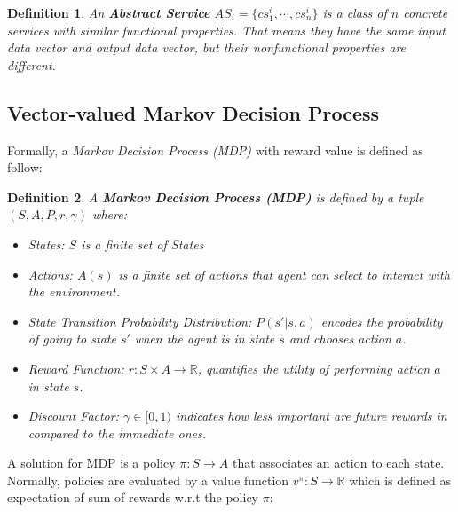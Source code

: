 \documentclass{sigchi}
\newtheorem{definition}{Definition}
\begin{document}
\begin{definition}
An \textbf{Abstract Service} $AS_i = \{ cs_1^i, \cdots, cs_n^i \}$ is a class of $n$ concrete services with similar functional properties. That means they have the same input data vector and output data vector, but their nonfunctional properties are different. 
\end{definition}


\subsection{Vector-valued Markov Decision Process}

Formally, a \emph{Markov Decision Process (MDP)} with reward value is defined as follow:

\begin{definition}
A \textbf{Markov Decision Process (MDP)} \cite{Puterman:1994:MDP:528623} is defined by a tuple $(S, A, P, r, \gamma)$ where:

\begin{itemize}
\item[-]States: $S$ is a finite set of States
\item[-] Actions: $A(s)$ is a finite set of actions that agent can select to interact with the environment.
\item[-] State Transition Probability Distribution: $P(s'| s,a)$ encodes the probability of going to state $s'$ when the agent is in state $s$ and chooses action $a$.
\item[-] Reward Function: $r : S \times A \longrightarrow \mathbb{R}$, quantifies the utility of performing action $a$ in state $s$.    
\item[-] Discount Factor: $\gamma \in [0,1)$ indicates how less important are future rewards in compared to the immediate ones. 
\end{itemize}

\end{definition}

A solution for MDP is a policy $\pi: S \longrightarrow A$ that associates an action to each state. Normally,  policies are evaluated by a value function $v^{\pi} : S \longrightarrow \mathbb{R}$ which is defined as expectation of sum of rewards w.r.t the policy $\pi$: 
\end{document}
